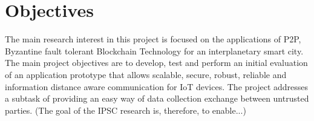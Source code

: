 \section{Objectives}
\quad The main research interest in this project is focused on the applications of P2P, Byzantine fault tolerant Blockchain Technology for an interplanetary smart city. The main project objectives are to develop, test and perform an initial evaluation of an application prototype that allows scalable, secure, robust, reliable and information distance aware communication for IoT devices. The project addresses a subtask of providing an easy way of data collection exchange between untrusted parties. (The goal of the IPSC research is, therefore, to enable...)
\vspace{\baselineskip}
